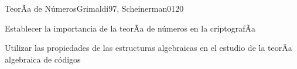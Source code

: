 \begin{syllabus}
\begin{unit}{TeorÃ­a de Números}{Grimaldi97, Scheinerman01}{20}
   \begin{unitgoals}
      \item Establecer la importancia de la teorÃ­a de números en la criptografÃ­a
      \item Utilizar las propiedades de las estructuras algebraicas en el estudio de la teorÃ­a algebraica de códigos
   \end{unitgoals}
\end{unit}

\begin{coursebibliography}
\end{coursebibliography}

\end{syllabus}

%

